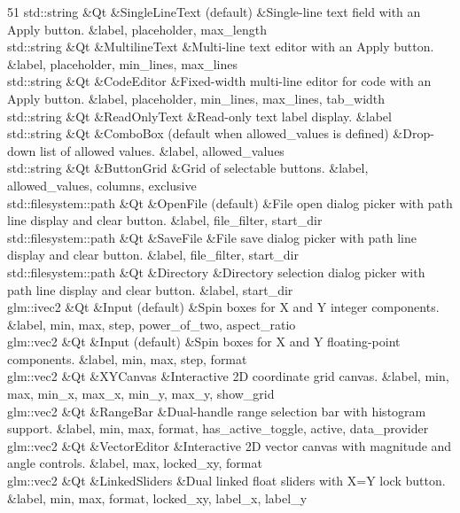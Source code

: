 \begin{DoxyTable}{5}{}{}{1}
std\+::string  &Qt  &Single\+Line\+Text (default)  &Single-\/line text field with an Apply button.  &label, placeholder, max\+\_\+length  \\
std\+::string  &Qt  &Multiline\+Text  &Multi-\/line text editor with an Apply button.  &label, placeholder, min\+\_\+lines, max\+\_\+lines  \\
std\+::string  &Qt  &Code\+Editor  &Fixed-\/width multi-\/line editor for code with an Apply button.  &label, placeholder, min\+\_\+lines, max\+\_\+lines, tab\+\_\+width  \\
std\+::string  &Qt  &Read\+Only\+Text  &Read-\/only text label display.  &label  \\
std\+::string  &Qt  &Combo\+Box (default when allowed\+\_\+values is defined)  &Drop-\/down list of allowed values.  &label, allowed\+\_\+values  \\
std\+::string  &Qt  &Button\+Grid  &Grid of selectable buttons.  &label, allowed\+\_\+values, columns, exclusive  \\
std\+::filesystem\+::path  &Qt  &Open\+File (default)  &File open dialog picker with path line display and clear button.  &label, file\+\_\+filter, start\+\_\+dir  \\
std\+::filesystem\+::path  &Qt  &Save\+File  &File save dialog picker with path line display and clear button.  &label, file\+\_\+filter, start\+\_\+dir  \\
std\+::filesystem\+::path  &Qt  &Directory  &Directory selection dialog picker with path line display and clear button.  &label, start\+\_\+dir  \\
glm\+::ivec2  &Qt  &Input (default)  &Spin boxes for X and Y integer components.  &label, min, max, step, power\+\_\+of\+\_\+two, aspect\+\_\+ratio  \\
glm\+::vec2  &Qt  &Input (default)  &Spin boxes for X and Y floating-\/point components.  &label, min, max, step, format  \\
glm\+::vec2  &Qt  &XYCanvas  &Interactive 2D coordinate grid canvas.  &label, min, max, min\+\_\+x, max\+\_\+x, min\+\_\+y, max\+\_\+y, show\+\_\+grid  \\
glm\+::vec2  &Qt  &Range\+Bar  &Dual-\/handle range selection bar with histogram support.  &label, min, max, format, has\+\_\+active\+\_\+toggle, active, data\+\_\+provider  \\
glm\+::vec2  &Qt  &Vector\+Editor  &Interactive 2D vector canvas with magnitude and angle controls.  &label, max, locked\+\_\+xy, format  \\
glm\+::vec2  &Qt  &Linked\+Sliders  &Dual linked float sliders with X=Y lock button.  &label, min, max, format, locked\+\_\+xy, label\+\_\+x, label\+\_\+y  \\

\end{DoxyTable}
